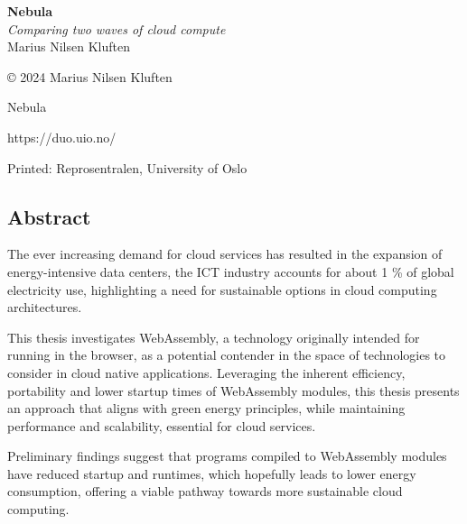 \documentclass[
  table]{report}
\begin{document}
\newpage

\begin{center}
\vspace*{\fill} 
\Huge \textbf{Nebula} \\[10pt]
\vspace{2cm} 
\Large \textit{Comparing two waves of cloud compute} \\[20pt]
\vspace{2cm} 
\Large Marius Nilsen Kluften \\[30pt]
\vspace*{\fill} 
\end{center}

\newpage
\listoftodos
\newpage

\null\vfill
\begin{flushleft}
\Large © 2024 Marius Nilsen Kluften\par
\Large Nebula \par
\Large https://duo.uio.no/ \par
\Large Printed: Reprosentralen, University of Oslo \par
\end{flushleft}

\newpage
\fancyfoot[C]{ \thepage\ }

\vspace*{\fill}
\begin{center}
\begin{minipage}{0.75\textwidth}

\chapter*{Abstract}

The ever increasing demand for cloud services has resulted in the expansion of
energy-intensive data centers, the ICT industry accounts for about 1 \% of global 
electricity use, highlighting a need for sustainable options
in cloud computing architectures.

\vspace{0.25cm}

This thesis investigates WebAssembly, a technology originally intended for running 
in the browser, as a potential contender in the space of technologies to
consider in cloud native applications. Leveraging the inherent efficiency,
portability and lower startup times of WebAssembly modules, this thesis presents an
approach that aligns with green energy principles, while maintaining performance and
scalability, essential for cloud services. 

\vspace{0.25cm}

Preliminary findings suggest that programs compiled to WebAssembly modules have
reduced startup and runtimes, which hopefully leads to lower energy consumption,
offering a viable pathway towards more sustainable cloud computing.

\end{minipage}
\end{center}
\vspace*{\fill}
\end{document}
